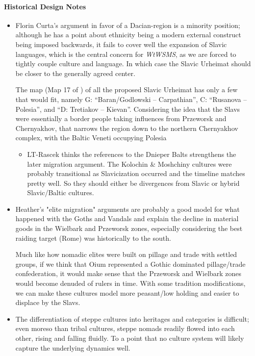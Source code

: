 \documentclass{article}
\newcommand{\wtwsms}{\textit{WtWSMS}}
\begin{document}
	\paragraph{Historical Design Notes}
	\begin{itemize}
		\item Florin Curta’s argument in favor of a Dacian-region is a minority position; although he has a point about ethnicity being a modern external construct being imposed backwards, it fails to cover well the expansion of Slavic languages, which is the central concern for \wtwsms, as we are forced to tightly couple culture and language.
		In which case the Slavic Urheimat should be closer to the generally agreed center.
		
		The map (Map 17 of \cite{HeatherEmpiresAndBarbarians}) of all the proposed Slavic Urheimat has only a few that would fit, namely G: “Baran/Godlowski – Carpathian”, C: “Rusanova – Polesia”, and “D: Tretiakov – Kievan”.
		Considering the idea that the Slavs were essentially a border people taking influences from Przeworsk and Chernyakhov, that narrows the region down to the northern Chernyakhov complex, with the Baltic Veneti occupying Polesia
		\begin{itemize}
			\item LT-Rascek thinks the references to the Dnieper Balts strengthens the later migration argument.
			The Kolochin \& Moshchiny cultures were probably transitional as Slavicization occurred and the timeline matches pretty well. So they should either be divergences from Slavic or hybrid Slavic/Baltic cultures.
		\end{itemize}
		\item Heather's "elite migration" arguments are probably a good model for what happened with the Goths and Vandals and explain the decline in material goods in the Wielbark and Przeworsk zones, especially considering the best raiding target (Rome) was historically to the south.
		
		Much like how nomadic elites were built on pillage and trade with settled groups, if we think that Oium represented a Gothic dominated pillage/trade confederation, it would make sense that the Przeworsk and Wielbark zones would become denuded of rulers in time.
		With some tradition modifications, we can make these cultures model more peasant/low holding and easier to displace by the Slavs.
		\item The differentiation of steppe cultures into heritages and categories is difficult; even moreso than tribal cultures, steppe nomads readily flowed into each other, rising and falling fluidly.
		To a point that no culture system will likely capture the underlying dynamics well.
	\end{itemize}
	
\end{document}
